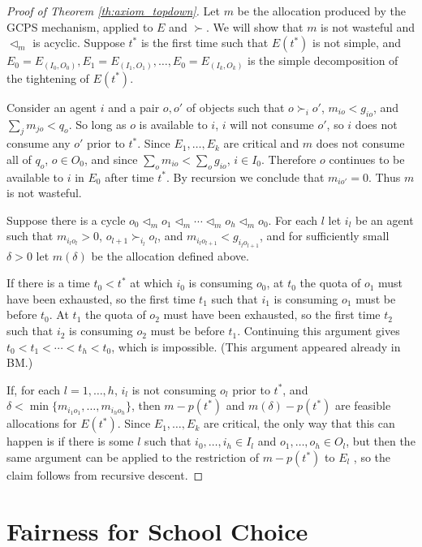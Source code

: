 \documentclass[12pt]{article}
\theoremstyle{definition}
\begin{document}
\begin{proof}[Proof of Theorem \ref{th:axiom_topdown}]
Let $m$ be the allocation produced by the GCPS mechanism, applied to $E$ and $\succ$.  We will show that $m$ is not wasteful and $\lhd_m$ is acyclic.  Suppose $t^*$ is the first time such that $E(t^*)$ is not simple, and $E_0 = E_{(I_0,O_0)}, E_1 = E_{(I_1,O_1)}, \ldots, E_0 = E_{(I_k,O_k)}$ is the simple decomposition of the tightening of $E(t^*)$. 

Consider an agent $i$ and a pair $o,o'$ of objects such that $o \succ_i o'$, $m_{io} < g_{io}$, and $\sum_j m_{jo} < q_o$.  So long as $o$ is available to $i$, $i$ will not consume $o'$, so $i$ does not consume any $o'$ prior to $t^*$.   Since $E_1, \ldots, E_k$ are critical and $m$ does not consume all of $q_o$, $o \in O_0$, and since $\sum_o m_{io} < \sum_o g_{io}$, $i \in I_0$.  Therefore $o$ continues to be available to $i$ in $E_0$ after time $t^*$.  By recursion we conclude that $m_{io'} = 0$.  Thus $m$ is not wasteful.

Suppose there is a cycle $o_0 \lhd_m o_1 \lhd_m \cdots \lhd_m o_h \lhd_m o_0$.  For each $l$ let $i_l$ be an agent such that  $m_{i_lo_l} > 0$, $o_{l+1} \succ_{i_l} o_l$, and $m_{i_lo_{l+1}} < g_{i_lo_{l+1}}$, and 
for sufficiently small $\delta > 0$ let $m(\delta)$ be the allocation defined above.  

If there is a time $t_0 < t^*$ at which $i_0$ is consuming $o_0$, at $t_0$ the quota of $o_1$ must have been exhausted, so the first time $t_1$ such that $i_1$ is consuming $o_1$ must be before $t_0$. At $t_1$ the quota of $o_2$ must have been exhausted, so the first time $t_2$ such that $i_2$ is consuming $o_2$ must be before $t_1$. Continuing this argument gives $t_0 < t_1 < \cdots < t_h < t_0$, which is impossible.  (This argument appeared already in BM.)

If, for each $l = 1, \ldots, h$, $i_l$ is not consuming $o_l$ prior to $t^*$, and $\delta < \min \{m_{i_1o_1},\ldots,m_{i_ho_h}\}$, then $m - p(t^*)$ and $m(\delta) - p(t^*)$ are feasible allocations for $E(t^*)$.  Since $E_1, \ldots, E_k$ are critical, the only way that this can happen is if there is some $l$ such that $i_0, \ldots, i_h \in I_l$ and $o_1, \ldots, o_h \in O_l$, but then the same argument can be applied to  the restriction of $m - p(t^*)$ to $E_l$ , so the claim follows from recursive descent.
\end{proof}

\section{Fairness for School Choice} \label{sec:Fairness}
\end{document}

